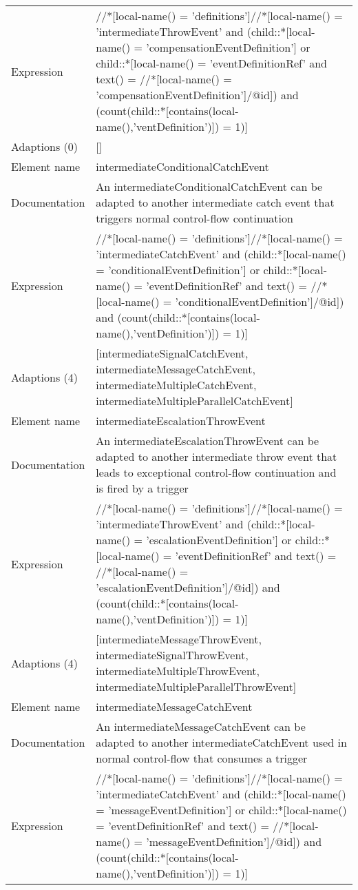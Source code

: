 \begin{center}
\begin{tiny}
\begin{longtable}{p{}|p{}}
Expression & //*[local-name() = 'definitions']//*[local-name() = 'intermediateThrowEvent' and (child::*[local-name() = 'compensationEventDefinition'] or child::*[local-name() = 'eventDefinitionRef' and text() = //*[local-name() = 'compensationEventDefinition']/@id]) and (count(child::*[contains(local-name(),'ventDefinition')]) = 1)]\\
\myrowcolour
Adaptions (0) & []\\
\midrule
Element name & intermediateConditionalCatchEvent\\
\myrowcolour
Documentation &An intermediateConditionalCatchEvent can be adapted to another intermediate catch event that triggers normal control-flow continuation\\
Expression & //*[local-name() = 'definitions']//*[local-name() = 'intermediateCatchEvent' and (child::*[local-name() = 'conditionalEventDefinition'] or child::*[local-name() = 'eventDefinitionRef' and text() = //*[local-name() = 'conditionalEventDefinition']/@id]) and (count(child::*[contains(local-name(),'ventDefinition')]) = 1)]\\
\myrowcolour
Adaptions (4) & [intermediateSignalCatchEvent, intermediateMessageCatchEvent, intermediateMultipleCatchEvent, intermediateMultipleParallelCatchEvent]\\
\midrule
Element name & intermediateEscalationThrowEvent\\
\myrowcolour
Documentation &An intermediateEscalationThrowEvent can be adapted to another intermediate throw event that leads to exceptional control-flow continuation and is fired by a trigger\\
Expression & //*[local-name() = 'definitions']//*[local-name() = 'intermediateThrowEvent' and (child::*[local-name() = 'escalationEventDefinition'] or child::*[local-name() = 'eventDefinitionRef' and text() = //*[local-name() = 'escalationEventDefinition']/@id]) and (count(child::*[contains(local-name(),'ventDefinition')]) = 1)]\\
\myrowcolour
Adaptions (4) & [intermediateMessageThrowEvent, intermediateSignalThrowEvent, intermediateMultipleThrowEvent, intermediateMultipleParallelThrowEvent]\\
\midrule
Element name & intermediateMessageCatchEvent\\
\myrowcolour
Documentation &An intermediateMessageCatchEvent can be adapted to another intermediateCatchEvent used in normal control-flow that consumes a trigger\\
Expression & //*[local-name() = 'definitions']//*[local-name() = 'intermediateCatchEvent' and (child::*[local-name() = 'messageEventDefinition'] or child::*[local-name() = 'eventDefinitionRef' and text() = //*[local-name() = 'messageEventDefinition']/@id]) and (count(child::*[contains(local-name(),'ventDefinition')]) = 1)]\\

\end{longtable}
\end{tiny}
\end{center}
